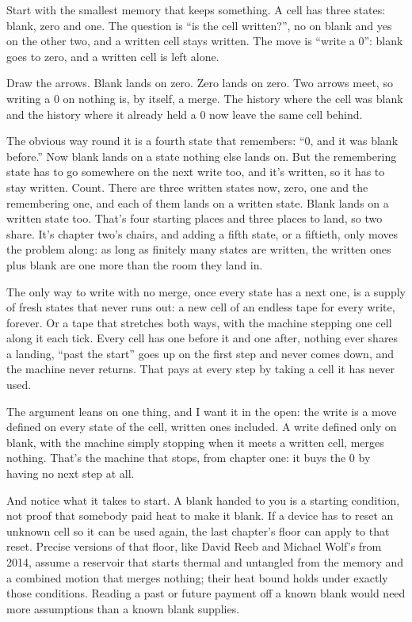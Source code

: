 \documentclass[11pt,twoside]{article}
\theoremstyle{thielethm}
\theoremstyle{thieledef}
\theoremstyle{thieledef}
\theoremstyle{thieledef}
\theoremstyle{thielethm}
\theoremstyle{thieleobs}
\theoremstyle{thielethm}
\begin{document}
Start with the smallest memory that keeps something. A cell has three states: blank, zero and one. The question is ``is the cell written?'', no on blank and yes on the other two, and a written cell stays written. The move is ``write a 0'': blank goes to zero, and a written cell is left alone.

Draw the arrows. Blank lands on zero. Zero lands on zero. Two arrows meet, so writing a 0 on nothing is, by itself, a merge. The history where the cell was blank and the history where it already held a 0 now leave the same cell behind.

The obvious way round it is a fourth state that remembers: ``0, and it was blank before.'' Now blank lands on a state nothing else lands on. But the remembering state has to go somewhere on the next write too, and it's written, so it has to stay written. Count. There are three written states now, zero, one and the remembering one, and each of them lands on a written state. Blank lands on a written state too. That's four starting places and three places to land, so two share. It's chapter two's chairs, and adding a fifth state, or a fiftieth, only moves the problem along: as long as finitely many states are written, the written ones plus blank are one more than the room they land in.

The only way to write with no merge, once every state has a next one, is a supply of fresh states that never runs out: a new cell of an endless tape for every write, forever. Or a tape that stretches both ways, with the machine stepping one cell along it each tick. Every cell has one before it and one after, nothing ever shares a landing, ``past the start'' goes up on the first step and never comes down, and the machine never returns. That pays at every step by taking a cell it has never used.

The argument leans on one thing, and I want it in the open: the write is a move defined on every state of the cell, written ones included. A write defined only on blank, with the machine simply stopping when it meets a written cell, merges nothing. That's the machine that stops, from chapter one: it buys the 0 by having no next step at all.

And notice what it takes to start. A blank handed to you is a starting condition, not proof that somebody paid heat to make it blank. If a device has to reset an unknown cell so it can be used again, the last chapter's floor can apply to that reset. Precise versions of that floor, like David Reeb and Michael Wolf's from 2014, assume a reservoir that starts thermal and untangled from the memory and a combined motion that merges nothing; their heat bound holds under exactly those conditions. Reading a past or future payment off a known blank would need more assumptions than a known blank supplies.
\end{document}
